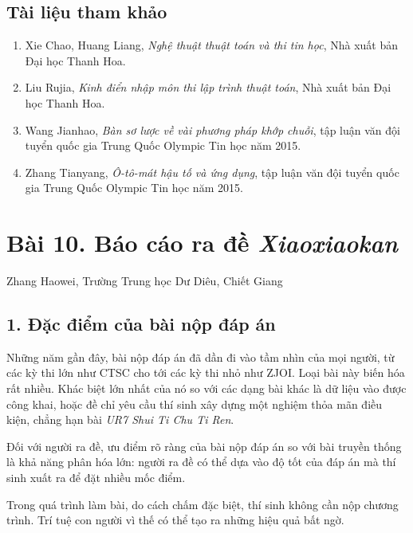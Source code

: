 \documentclass[11pt]{article}
\begin{document}
\subsection*{Tài liệu tham khảo}

\begin{enumerate}
  \item Xie Chao, Huang Liang, \emph{Nghệ thuật thuật toán và thi tin học},
  Nhà xuất bản Đại học Thanh Hoa.
  \item Liu Rujia, \emph{Kinh điển nhập môn thi lập trình thuật toán}, Nhà
  xuất bản Đại học Thanh Hoa.
  \item Wang Jianhao, \emph{Bàn sơ lược về vài phương pháp khớp chuỗi}, tập
  luận văn đội tuyển quốc gia Trung Quốc Olympic Tin học năm 2015.
  \item Zhang Tianyang, \emph{Ô-tô-mát hậu tố và ứng dụng}, tập luận văn đội
  tuyển quốc gia Trung Quốc Olympic Tin học năm 2015.
\end{enumerate}

\section*{Bài 10. Báo cáo ra đề \emph{Xiaoxiaokan}}

\begin{center}
Zhang Haowei, Trường Trung học Dư Diêu, Chiết Giang
\end{center}

\subsection*{1. Đặc điểm của bài nộp đáp án}

Những năm gần đây, bài nộp đáp án đã dần đi vào tầm nhìn của mọi người, từ
các kỳ thi lớn như CTSC cho tới các kỳ thi nhỏ như ZJOI. Loại bài này biến
hóa rất nhiều. Khác biệt lớn nhất của nó so với các dạng bài khác là dữ liệu
vào được công khai, hoặc đề chỉ yêu cầu thí sinh xây dựng một nghiệm thỏa mãn
điều kiện, chẳng hạn bài \emph{UR7 Shui Ti Chu Ti Ren}.

Đối với người ra đề, ưu điểm rõ ràng của bài nộp đáp án so với bài truyền
thống là khả năng phân hóa lớn: người ra đề có thể dựa vào độ tốt của đáp án
mà thí sinh xuất ra để đặt nhiều mốc điểm.

Trong quá trình làm bài, do cách chấm đặc biệt, thí sinh không cần nộp chương
trình. Trí tuệ con người vì thế có thể tạo ra những hiệu quả bất ngờ.
\end{document}
